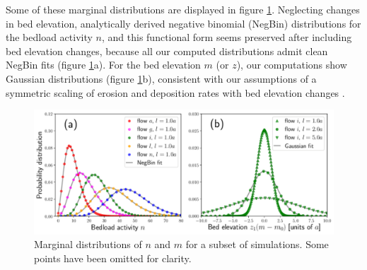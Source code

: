 \documentclass[draft]{agujournal2018}
\begin{document}
Some of these marginal distributions are displayed in figure \ref{fig:pdfs}.
Neglecting changes in bed elevation, \citet{Ancey2008} analytically derived negative binomial (NegBin) distributions for the bedload activity $n$, and this functional form seems preserved after including bed elevation changes, because all our computed distributions admit clean NegBin fits (figure \ref{fig:pdfs}a).
For the bed elevation $m$ (or $z$), our computations show Gaussian distributions (figure \ref{fig:pdfs}b), consistent with our assumptions of a symmetric scaling of erosion and deposition rates with bed elevation changes \citep[e.g.][]{Wong2007}.

\begin{figure}[t!]
	\includegraphics[width=\linewidth,keepaspectratio]{./figures/montage2.pdf}
	\caption{Marginal distributions of $n$ and $m$ for a subset of simulations. Some points have been omitted for clarity.}
	\label{fig:pdfs}
\end{figure}
\end{document}

